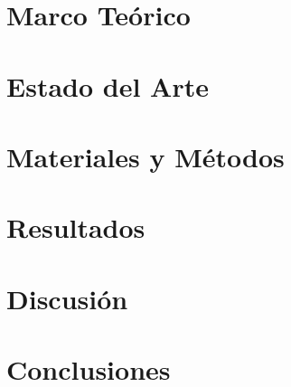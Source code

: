 \documentclass[spanish, a4paper, 12pt, twoside]{article}
\numberwithin{equation}{section} %
\begin{document}
\section{Marco Teórico}
    

\section{Estado del Arte}
    

\section{Materiales y Métodos}
    

\section{Resultados}
    

\section{Discusión}
    

\section{Conclusiones}
    
\renewcommand{\sectionbreak}{} %

%     

\clearpage
\renewcommand\refname{Referencias Bibliográficas} %
{ %
{} %
}

\clearpage
\renewcommand{\appendixpagename}{Apéndice} %
\renewcommand{\appendixtocname}{Apéndice} %
\appendixpage
\addappheadtotoc

\makeatletter %
\def\toclevel@section{2}
\def\toclevel@subsection{3}
\makeatother
\begin{appendices}
    
\end{appendices}
\end{document}
